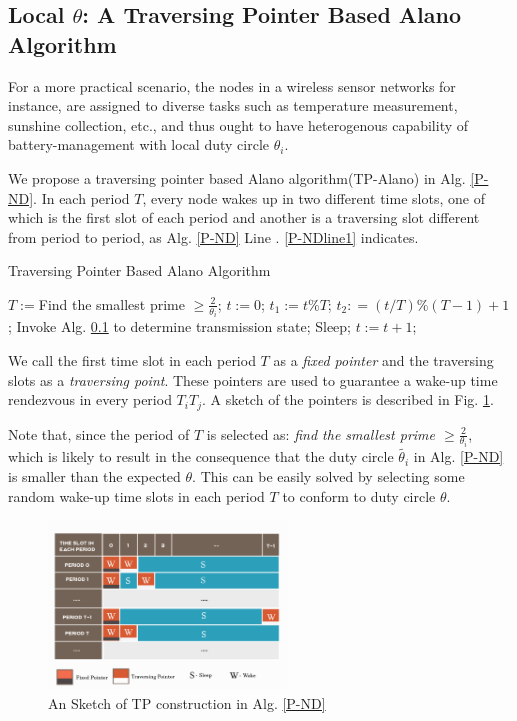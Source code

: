 


\subsection{Local $\theta$: A Traversing Pointer Based Alano Algorithm}


For a more practical scenario, the nodes in a wireless sensor networks 
for instance, are assigned to diverse tasks such as temperature measurement,
sunshine collection, etc., and thus ought to have heterogenous capability of
battery-management with local duty circle $\theta_i$.

We propose a traversing pointer based Alano algorithm(TP-Alano) in Alg. \ref{P-ND}.
In each period $T$, every node wakes up in two different time slots, one of which is the
first slot of each period and another is a traversing slot different from period to period, 
as Alg. \ref{P-ND} Line . \ref{P-NDline1} indicates. 

\begin{algorithm}
\caption{Traversing Pointer Based Alano Algorithm}
\label{P-ND}
\begin{algorithmic}[1]
\STATE $T := $Find the smallest prime $\geq \frac{2}{\theta_i}$;
\STATE $t := 0$;
	\STATE $t_1 := t \% T$;
	\STATE $t_2 : =( t / T ) \% (T - 1) +1$;\label{P-NDline1}
    		\STATE Invoke Alg. \ref{} to determine transmission state;
	\ELSE
    		\STATE Sleep;
	\ENDIF
	\STATE $t := t + 1$;
\ENDWHILE
\end{algorithmic}
\end{algorithm}

We call the first time slot in each period $T$ as a \emph{fixed pointer} and the traversing
slots as a \emph{traversing point}. These pointers are used to guarantee a wake-up time rendezvous
in every period $T_iT_j$. A sketch of the pointers is described in Fig. \ref{TP}.
 
Note that, since the period of $T$ is selected as: 
\emph{find the smallest prime $\geq \frac{2}{\theta_i}$},
which is likely to result in the consequence that the duty 
circle $\widetilde{\theta_i}$ in Alg. \ref{P-ND} is smaller than the expected
$\theta$. This can be easily solved by selecting some random wake-up time slots 
in each period $T$ to conform to duty circle $\theta$.

\begin{figure}[htb]
\centering
\includegraphics[width=2.5in]{./Figure/TP}
\caption{An Sketch of TP construction in Alg. \ref{P-ND}}
\label{TP}
\end{figure}

